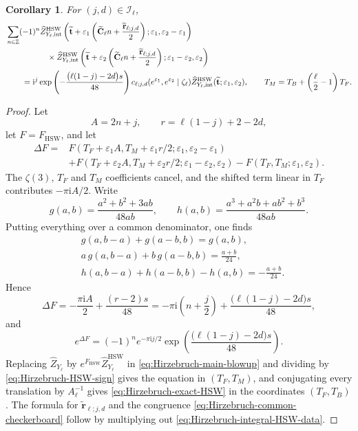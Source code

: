 \documentclass{amsart}
\newtheorem{corollary}{Corollary}
\theoremstyle{definition}
\numberwithin{equation}{section}
\newcommand{\Z}{\mathbb Z}
\newcommand{\eps}{\varepsilon}
\begin{document}
\begin{corollary}
\label{cor:Hirzebruch-exact-HSW}
For \((j,d)\in\mathcal I_\ell\),
\begin{equation}
\begin{aligned}
 &\sum_{n\in\Z}(-1)^n
 \widehat Z_{Y_\ell,\mathrm{int}}^{\mathrm{HSW}}\left(
 \widetilde{\mathbf t}+\eps_1\left(\widetilde{\mathbf C}_\ell n+
 \frac{\widetilde{\mathbf r}_{\ell;j,d}}2\right);
 \eps_1,\eps_2-\eps_1\right)\\
 &\hspace{18mm}\times
 \widehat Z_{Y_\ell,\mathrm{int}}^{\mathrm{HSW}}\left(
 \widetilde{\mathbf t}+\eps_2\left(\widetilde{\mathbf C}_\ell n+
 \frac{\widetilde{\mathbf r}_{\ell;j,d}}2\right);
 \eps_1-\eps_2,\eps_2\right)\\
 &\qquad=
 \mathrm{i}^j\exp\left(-\frac{\bigl(\ell(1-j)-2d\bigr)s}{48}\right)
 c_{\ell;j,d}(e^{\eps_1},e^{\eps_2}\mid\zeta_\ell)
 \widehat Z_{Y_\ell,\mathrm{int}}^{\mathrm{HSW}}
 (\widetilde{\mathbf t};\eps_1,\eps_2),
 \qquad T_M=T_B+\left(\frac\ell2-1\right)T_F.
\end{aligned}
\label{eq:Hirzebruch-exact-HSW}
\end{equation}
\end{corollary}

\begin{proof}
Let
\[
 A=2n+j,\qquad r=\ell(1-j)+2-2d,
\]
let \(F=F_{\mathrm{HSW}}\), and let
\begin{align*}
 \Delta F={}&F(T_F+\eps_1A,T_M+\eps_1r/2;
                  \eps_1,\eps_2-\eps_1)\\
 &+F(T_F+\eps_2A,T_M+\eps_2r/2;
                  \eps_1-\eps_2,\eps_2)
   -F(T_F,T_M;\eps_1,\eps_2).
\end{align*}
The \(\zeta(3)\), \(T_F\) and \(T_M\) coefficients cancel, and the shifted term linear in \(T_F\) contributes \(-\pi\mathrm{i}A/2\).  Write
\[
 g(a,b)=\frac{a^2+b^2+3ab}{48ab},\qquad
 h(a,b)=\frac{a^3+a^2b+ab^2+b^3}{48ab}.
\]
Putting everything over a common denominator, one finds
\begin{align*}
 &g(a,b-a)+g(a-b,b)=g(a,b),\\
 &a\,g(a,b-a)+b\,g(a-b,b)=\frac{a+b}{24},\\
 &h(a,b-a)+h(a-b,b)-h(a,b)=-\frac{a+b}{24}.
\end{align*}
Hence
\[
 \Delta F=-\frac{\pi\mathrm{i}A}{2}+\frac{(r-2)s}{48}
 =-\pi\mathrm{i}\left(n+\frac j2\right)
  +\frac{\bigl(\ell(1-j)-2d\bigr)s}{48},
\]
and
\begin{equation}
 e^{\Delta F}=(-1)^n e^{-\pi\mathrm{i}j/2}
 \exp\left(\frac{\bigl(\ell(1-j)-2d\bigr)s}{48}\right).
\label{eq:Hirzebruch-HSW-sign}
\end{equation}
Replacing \(\widehat Z_{Y_\ell}\) by \(e^{F_{\mathrm{HSW}}}\widehat Z_{Y_\ell}^{\mathrm{HSW}}\) in \eqref{eq:Hirzebruch-main-blowup} and dividing by \eqref{eq:Hirzebruch-HSW-sign} gives the equation in \((T_F,T_M)\), and conjugating every translation by \(A_\ell^{-1}\) gives \eqref{eq:Hirzebruch-exact-HSW} in the coordinates \((T_F,T_B)\).  The formula for \(\widetilde{\mathbf r}_{\ell;j,d}\) and the congruence \eqref{eq:Hirzebruch-common-checkerboard} follow by multiplying out \eqref{eq:Hirzebruch-integral-HSW-data}.
\end{proof}
\end{document}
